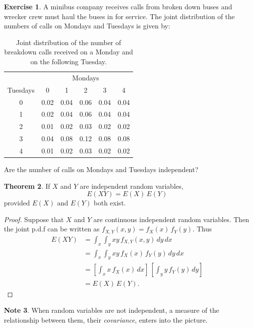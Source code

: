 \documentclass[12pt,a4paper]{report}
\theoremstyle{definition}
\newtheorem{thm}{Theorem}[section]
\newtheorem{exe}[thm]{Exercise}
\newtheorem{note}[thm]{Note}
\theoremstyle{plain}
\theoremstyle{definition}
\begin{document}
\begin{exe}
A minibus company receives calls from broken down buses and wrecker crew must haul the buses in for service. The joint distribution of the numbers of calls on Mondays and Tuesdays is given by:

\begin{table}[H]
\centering

\begin{tabular}{c|ccccc}
&\multicolumn{5}{c}{Mondays}\\
Tuesdays & 0 & 1 & 2 & 3 & 4\\
\hline
0 & 0.02 & 0.04 & 0.06 & 0.04 & 0.04\\
1 & 0.02 & 0.04 & 0.06 & 0.04 & 0.04\\
2 & 0.01 & 0.02 & 0.03 & 0.02 & 0.02\\
3 & 0.04 & 0.08 & 0.12 & 0.08 & 0.08\\
4 & 0.01 & 0.02 & 0.03 & 0.02 & 0.02\\
\end{tabular}
\caption{Joint distribution of the number of breakdown calls received on a Monday and on the following Tuesday.}
\end{table}

Are the number of calls on Mondays and Tuesdays independent?
\end{exe}


\begin{thm}
If $X$ and $Y$ are independent random variables, \[E(XY) = E(X)\, E(Y)\] provided $E(X)$ and $E(Y)$ both exist.
\end{thm}


\begin{proof}
Suppose that $X$ and $Y$ are  continuous independent random variables. Then the joint p.d.f can be written as $f_{X,Y}(x,y) = f_X(x)\, f_Y(y)$. Thus 
\begin{align*}
E(XY) & = \int_x\int_y xy\, f_{X,Y}(x,y)\, dy\, dx\\
      & = \int_x\int_y xy\, f_X(x)\, f_Y(y)\, dy \, dx\\
      & = \left[\int_x x\, f_X(x)\, dx\right]\, \left[\int_yy\,f_Y(y)\, dy\right]\\
      & = E(X)\, E(Y).
\end{align*}
\end{proof}



\begin{note}
When random variables are not independent, a measure of the relationship between them, their \textit{covariance}, enters into the picture.
\end{note}
\end{document}
